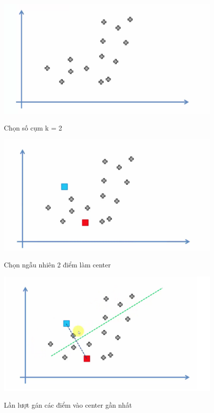 \documentclass[a4paper,14pt]{extreport}
\begin{document}
\begin{figure}  
    \centering
    \includegraphics[scale=0.6]{img/kmean-1.png}
    \caption{Chọn số cụm k = 2}
    \cite{kmean}
    \label{fig:kmean-2k}
\end{figure}
\begin{figure}  
    \centering
    \includegraphics[scale=0.6]{img/kmean-2.png}
    \caption{Chọn ngẫu nhiên 2 điểm làm center}
    \cite{kmean}
    \label{fig:kmean-2center}
\end{figure}
\begin{figure}  
    \centering
    \includegraphics[scale=0.6]{img/kmean-3.png}
    \caption{Lần lượt gán các điểm vào center gần nhất }
    \cite{kmean}
    \label{fig:kmean-assign}
\end{figure}
\end{document}
